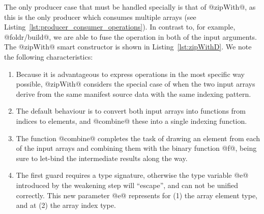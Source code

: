 The only producer case that must be handled specially is  that of @zipWith@, as
this is the only producer which consumes multiple arrays (see
Listing~\ref{lst:producer_consumer_operations}). In contrast to, for example,
@foldr/build@, we are able to fuse the operation in
both of the input arguments. The @zipWith@ smart constructor is shown in
Listing~\ref{lst:zipWithD}. We note the following characteristics:
%
\begin{enumerate}
\item Because it is advantageous to express operations in the most specific way
    possible, @zipWith@ considers the special case of when the two input arrays
    derive from the same manifest source data with the same indexing pattern.

\item The default behaviour is to convert both input arrays into functions from
    indices to elements, and @combine@ these into a single indexing function.

\item The function @combine@ completes the task of drawing an element from each
    of the input arrays and combining them with the binary function @f@, being
    sure to let-bind the intermediate results along the way.

\item The first guard requires a type signature, otherwise the type variable @e@
    introduced by the weakening step will ``escape'', and can not be unified
    correctly. This new parameter @e@ represents for (1) the array element type,
    and at (2) the array index type.

\end{enumerate}

